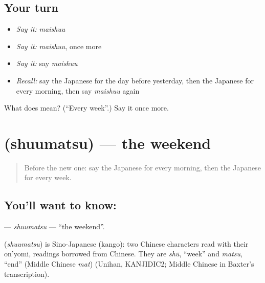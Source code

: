 \subsection*{Your turn}
\begin{itemize}
\raggedright
  \item \emph{Say it:} \emph{maishuu}
  \item \emph{Say it:} \emph{maishuu}, once more
  \item \emph{Say it:} say \emph{maishuu}
  \item \emph{Recall:} say the Japanese for the day before yesterday, then the Japanese for every morning, then say \emph{maishuu} again
\end{itemize}

\begin{tcolorbox}[breakable,colback=teal!4,colframe=teal!35!black,title={Before you move on}]
What does  mean? (\textquotedblleft{}Every week\textquotedblright{}.) Say it once more.
\end{tcolorbox}
\section[\texorpdfstring{\ja{しゅうまつ} (shuumatsu)}{しゅうまつ (shuumatsu)}]{ (shuumatsu) — the weekend}

\label{lesson:JA-C74-shuumatsu}



\begin{quote}
Before the new one: say the Japanese for every morning, then the Japanese for every week.
\end{quote}

\subsection*{You'll want to know: }
\textbf{} — \emph{shuumatsu} — \textquotedblleft{}the weekend\textquotedblright{}.

\begin{cousinweb}
\textbf{} (\emph{shuumatsu}) is Sino-Japanese (kango): two Chinese characters read with their on'yomi, readings borrowed from Chinese. They are \emph{shū}, \textquotedblleft{}week\textquotedblright{} and \emph{matsu}, \textquotedblleft{}end\textquotedblright{} (Middle Chinese \emph{mat}) (Unihan, KANJIDIC2; Middle Chinese in Baxter's transcription).
\end{cousinweb}

